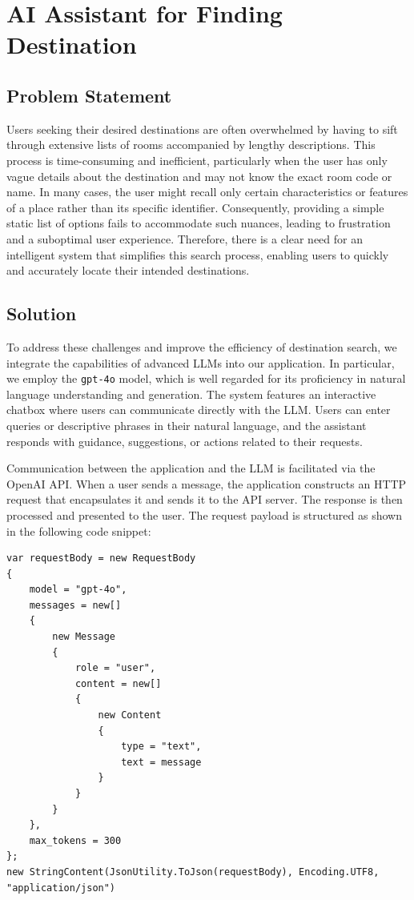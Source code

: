 \section{AI Assistant for Finding Destination}\label{section:ai-assistant}

\subsection{Problem Statement}
Users seeking their desired destinations are often overwhelmed by having to sift through extensive lists of rooms accompanied by lengthy descriptions. This process is time-consuming and inefficient, particularly when the user has only vague details about the destination and may not know the exact room code or name. In many cases, the user might recall only certain characteristics or features of a place rather than its specific identifier. Consequently, providing a simple static list of options fails to accommodate such nuances, leading to frustration and a suboptimal user experience. Therefore, there is a clear need for an intelligent system that simplifies this search process, enabling users to quickly and accurately locate their intended destinations.

\subsection{Solution}
To address these challenges and improve the efficiency of destination search, we integrate the capabilities of advanced LLMs into our application. In particular, we employ the \texttt{gpt-4o} model, which is well regarded for its proficiency in natural language understanding and generation. The system features an interactive chatbox where users can communicate directly with the LLM. Users can enter queries or descriptive phrases in their natural language, and the assistant responds with guidance, suggestions, or actions related to their requests.

Communication between the application and the LLM is facilitated via the OpenAI API. When a user sends a message, the application constructs an HTTP request that encapsulates it and sends it to the API server. The response is then processed and presented to the user. The request payload is structured as shown in the following code snippet:

\begin{lstlisting}[style=cSharp]
var requestBody = new RequestBody
{
    model = "gpt-4o",
    messages = new[]
    {
        new Message
        {
            role = "user",
            content = new[]
            {
                new Content
                {
                    type = "text",
                    text = message
                }
            }
        }
    },
    max_tokens = 300
};
new StringContent(JsonUtility.ToJson(requestBody), Encoding.UTF8, "application/json")
\end{lstlisting}

